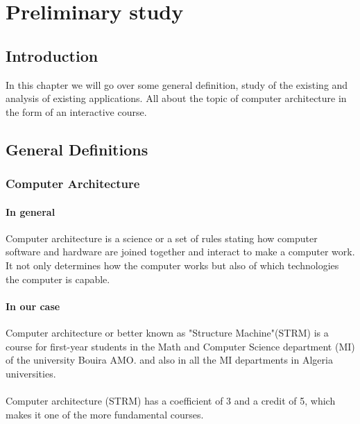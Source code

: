 \chapter{Preliminary study}

\section{Introduction}
In this chapter we will go over some general definition, study of the existing and analysis of existing applications.
 All about the topic of computer architecture in the form of an interactive course.


\section{General Definitions}

\subsection{Computer Architecture}
\subsubsection{In general}
Computer architecture is a science or a set of rules stating how computer software and hardware are 
joined together and interact to make a computer work. It not only determines how the computer works 
but also of which technologies the computer is capable.\cite{Pam2018-so}
\subsubsection{In our case}
Computer architecture or better known as "Structure Machine"(STRM) is a course for first-year 
students in the Math and Computer Science department (MI) 
of the university Bouira AMO. and also in all the MI departments in Algeria universities.\\ \\
\indent Computer architecture (STRM) has a coefficient of 3 and a credit of 5, which makes it one of the more fundamental courses.\cite{prog-MI}\\


